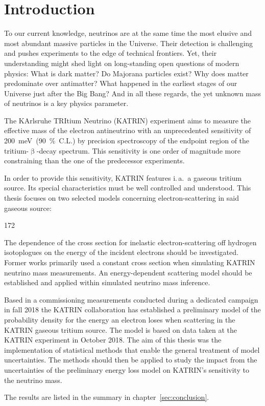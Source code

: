 \chapter{Introduction}
To our current knowledge, neutrinos are at the same time the most elusive and most abundant massive particles in the Universe. Their detection is challenging and pushes experiments to the edge of technical frontiers. Yet, their understanding might shed light on long-standing open questions of modern physics: What is dark matter? Do Majorana particles exist? Why does matter predominate over antimatter? What happened in the earliest stages of our Universe just after the Big Bang? And in all these regards, the yet unknown mass of neutrinos is a key physics parameter.

The KArlsruhe TRItium Neutrino (KATRIN) experiment aims to measure the effective mass of the electron antineutrino with an unprecedented sensitivity of \mbox{\SI{200}{meV} (\SI{90}{\percent} C.L.)} by precision spectroscopy of the endpoint region of the tritium-$\upbeta$-decay spectrum. This sensitivity is one order of magnitude more constraining than the one of the predecessor experiments.

In order to provide this sensitivity, KATRIN features i.\,a.~a gaseous tritium source. Its special characteristics must be well controlled and understood. This thesis focuses on two selected models concerning electron-scattering in said gaseous source: 
\begin{dingautolist}{172}
	\item\label{itm:introductionEDepCrossSec} The dependence of the cross section for inelastic electron-scattering off hydrogen isotoplogues on the energy of the incident electrons should be investigated. Former works primarily used a constant cross section when simulating KATRIN neutrino mass measurements. An energy-dependent scattering model should be established and applied within simulated neutrino mass inference.
	\item\label{itm:introductionKatrinEloss} Based in a commissioning measurements conducted during a dedicated campaign in fall 2018 the KATRIN collaboration has established a preliminary model of the probability density for the energy an electron loses when scattering in the KATRIN gaseous tritium source. The model is based on data taken at the KATRIN experiment in October 2018. The aim of this thesis was the implementation of statistical methods that enable the general treatment of model uncertainties. The methods should then be applied to study the impact from the uncertainties of the preliminary energy loss model on KATRIN's sensitivity to the neutrino mass.
\end{dingautolist}
The results are listed in the summary in chapter~\ref{sec:conclusion}.

